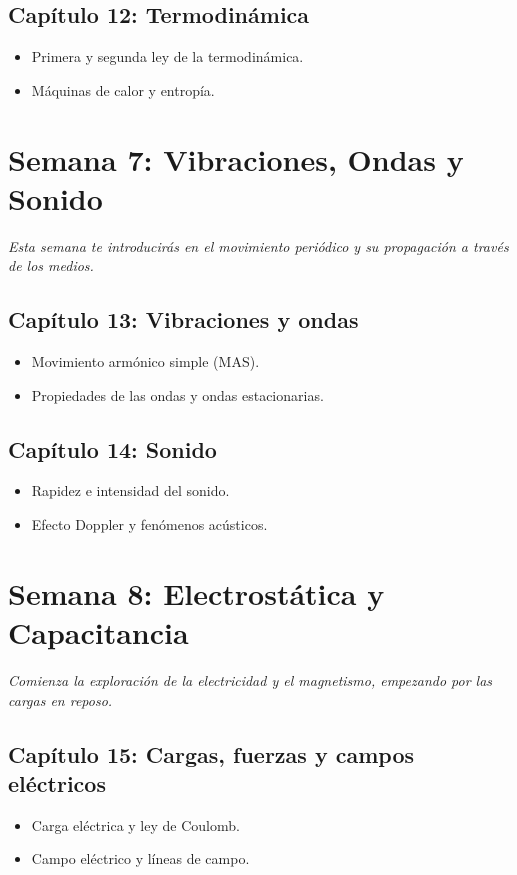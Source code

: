 \documentclass[12pt, a4paper]{article}
\begin{document}
\subsection*{Capítulo 12: Termodinámica}
\begin{itemize}[leftmargin=*]
    \item Primera y segunda ley de la termodinámica.
    \item Máquinas de calor y entropía.
\end{itemize}

\section*{Semana 7: Vibraciones, Ondas y Sonido}
\textit{Esta semana te introducirás en el movimiento periódico y su propagación a través de los medios.}
\subsection*{Capítulo 13: Vibraciones y ondas}
\begin{itemize}[leftmargin=*]
    \item Movimiento armónico simple (MAS).
    \item Propiedades de las ondas y ondas estacionarias.
\end{itemize}
\subsection*{Capítulo 14: Sonido}
\begin{itemize}[leftmargin=*]
    \item Rapidez e intensidad del sonido.
    \item Efecto Doppler y fenómenos acústicos.
\end{itemize}

\newpage

\section*{Semana 8: Electrostática y Capacitancia}
\textit{Comienza la exploración de la electricidad y el magnetismo, empezando por las cargas en reposo.}
\subsection*{Capítulo 15: Cargas, fuerzas y campos eléctricos}
\begin{itemize}[leftmargin=*]
    \item Carga eléctrica y ley de Coulomb.
    \item Campo eléctrico y líneas de campo.
\end{itemize}
\end{document}
